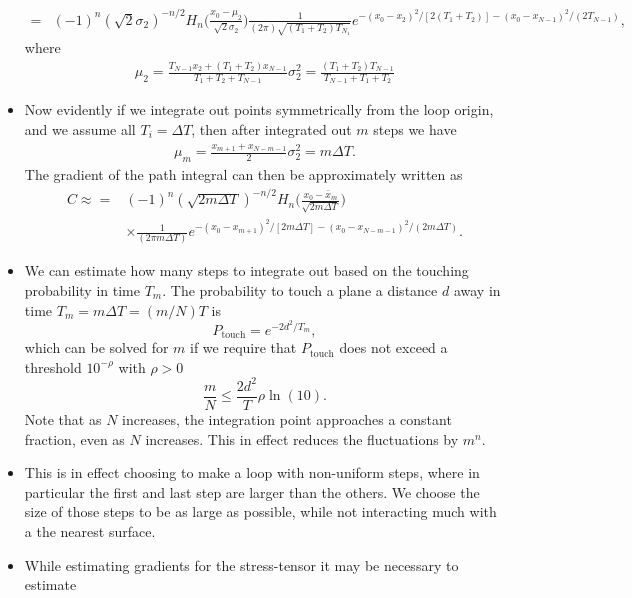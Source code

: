 \begin{itemize}
\begin{align}
      =&(-1)^n(\sqrt{2}\sigma_2)^{-n/2}H_n\bigg(\frac{x_0-\mu_2}{\sqrt{2}\sigma_2}\bigg)
      \frac{1}{(2\pi)\sqrt{(T_1+T_2)T_{N_1}}}e^{-(x_0-x_2)^2/[2(T_1+T_2)]-(x_0-x_{N-1})^2/(2T_{N-1})},
    \end{align}
    where 
    \begin{gather}
      \mu_2 = \frac{T_{N-1}x_2+ (T_1+T_2)x_{N-1}}{T_1+T_2+T_{N-1}}
      \sigma_2^2 = \frac{(T_1+T_2)T_{N-1}}{T_{N-1}+T_1+T_2}
    \end{gather}
  \item Now evidently if we integrate out points symmetrically from the loop origin, and we 
    assume all $T_i=\Delta T$, then after integrated out $m$ steps we have 
    \begin{gather}
      \mu_m = \frac{x_{m+1}+ x_{N-m-1}}{2}
      \sigma_2^2 = m\Delta T.
    \end{gather}
    The gradient of the path integral can then be approximately written as 
    \begin{align}
      C\approx
      =&(-1)^n(\sqrt{2 m\Delta T})^{-n/2}H_n\bigg(\frac{x_0-\bar{x}_m}{\sqrt{2 m\Delta T}}\bigg)\nonumber\\
      &\times \frac{1}{(2\pi m \Delta T)}e^{-(x_0-x_{m+1})^2/[2m\Delta T]-(x_0-x_{N-m-1})^2/(2m\Delta T)}.
    \end{align}
  \item We can estimate how many steps to integrate out based on the touching probability in time $T_m$.  
    The probability to touch a plane a distance $d$ away in time $T_m=m\Delta T = (m/N)T$ is 
    \begin{equation}
      P_{\text{touch}} = e^{-2d^2/T_m},
    \end{equation}
    which can be solved for $m$ if we require that $P_{\mathrm{touch}}$ does not exceed a threshold
    $10^{-\rho}$ with $\rho>0$  
    \begin{equation}
      \frac{m}{N} \le \frac{2d^2}{T}\rho\ln(10).
    \end{equation}
    Note that as $N$ increases, the integration point approaches a constant fraction, even as $N$ increases.  
    This in effect reduces the fluctuations by $m^n$.  
    \item This is in effect choosing to make a loop with non-uniform steps, where in particular the first
    and last step are larger than the others.  We choose the size of those steps to be as 
    large as possible, while not interacting much with a the nearest surface.  
    \item While estimating gradients for the stress-tensor it may be necessary to estimate 

\end{itemize}
